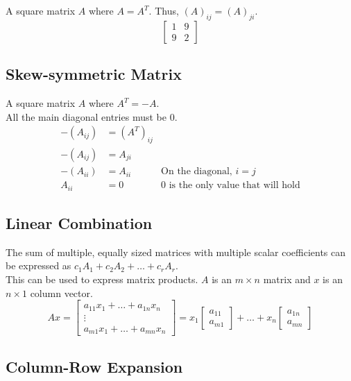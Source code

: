 \documentclass[12pt]{article}
\begin{document}
A square matrix $A$ where $A = A^T$. Thus, $(A)_{ij} = (A)_{ji}$.
$$
\begin{bmatrix}1 & 9\\9 & 2\end{bmatrix}
$$


\subsection{Skew-symmetric Matrix}

A square matrix $A$ where $A^T = -A$.\\
All the main diagonal entries must be 0.
\begin{align*}
    -(A_{ij}) &= (A^T)_{ij}\\
    -(A_{ij}) &= A_{ji}\\
    -(A_{ii}) &= A_{ii}&\text{On the diagonal, }i = j\\
    A_{ii} &= 0&\text{0 is the only value that will hold}
\end{align*}


\subsection{Linear Combination}

The sum of multiple, equally sized matrices with multiple scalar coefficients can be expressed as $c_1A_1 + c_2A_2 + \dots + c_rA_r$.\\
This can be used to express matrix products. $A$ is an $m \times n$ matrix and $x$ is an $n \times 1$ column vector.
$$
Ax =
\begin{bmatrix}
    a_{11}x_1 + \dots + a_{1n}x_n\\
    \vdots\\
    a_{m1}x_1 + \dots + a_{mn}x_n
\end{bmatrix}
=
x_1
\begin{bmatrix}
    a_{11}\\
    a_{m1}
\end{bmatrix}
+ \dots +
x_n
\begin{bmatrix}
    a_{1n}\\
    a_{mn}
\end{bmatrix}
$$


\subsection{Column-Row Expansion}
\end{document}
